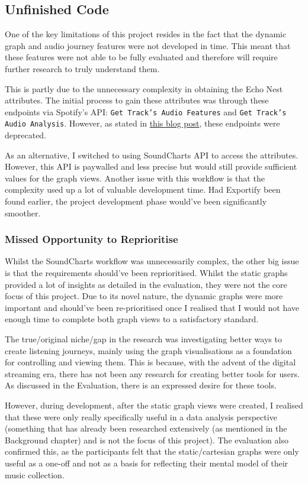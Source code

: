 \subsection{Unfinished Code}
One of the key limitations of this project resides in the fact that the dynamic graph and audio journey features were not developed in time. This meant that these features were not able to be fully evaluated and therefore will require further research to truly understand them.

This is partly due to the unnecessary complexity in obtaining the Echo Nest attributes. The initial process to gain these attributes was through these endpoints via Spotify's API: \texttt{Get Track's Audio Features} and \texttt{Get Track's Audio Analysis}. However, as stated in \href{https://developer.spotify.com/blog/2024-11-27-changes-to-the-web-api}{this blog post}, these endpoints were deprecated.

As an alternative, I switched to using SoundCharts API to access the attributes. However, this API is paywalled and less precise but would still provide sufficient values for the graph views. Another issue with this workflow is that the complexity used up a lot of valuable development time. Had Exportify been found earlier, the project development phase would've been significantly smoother.

\subsubsection{Missed Opportunity to Reprioritise}
Whilst the SoundCharts workflow was unnecessarily complex, the other big issue is that the requirements should've been reprioritised. Whilst the static graphs provided a lot of insights as detailed in the evaluation, they were not the core focus of this project. Due to its novel nature, the dynamic graphs were more important and should've been re-prioritised once I realised that I would not have enough time to complete both graph views to a satisfactory standard.

The true/original niche/gap in the research was investigating better ways to create listening journeys, mainly using the graph visualisations as a foundation for controlling and viewing them. This is because, with the advent of the digital streaming era, there has not been any research for creating better tools for users. As discussed in the Evaluation, there is an expressed desire for these tools.

However, during development, after the static graph views were created, I realised that these were only really specifically useful in a data analysis perspective (something that has already been researched extensively (as mentioned in the Background chapter) and is not the focus of this project). The evaluation also confirmed this, as the participants felt that the static/cartesian graphs were only useful as a one-off and not as a basis for reflecting their mental model of their music collection.

